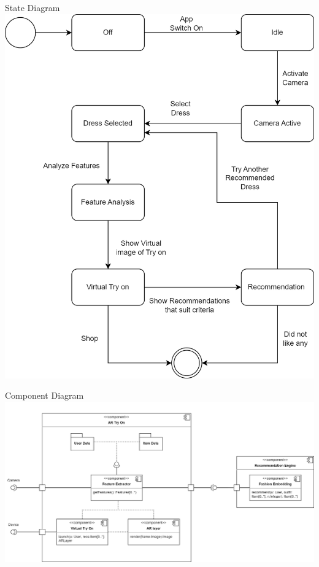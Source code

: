 \begin{frame}{State Diagram}
	\centering
	\includegraphics[height=0.8 \textheight]{components/images/state.png}
\end{frame}

\begin{frame}{Component Diagram}
	\includegraphics[width=\textwidth]{components/images/component.png}
\end{frame}

